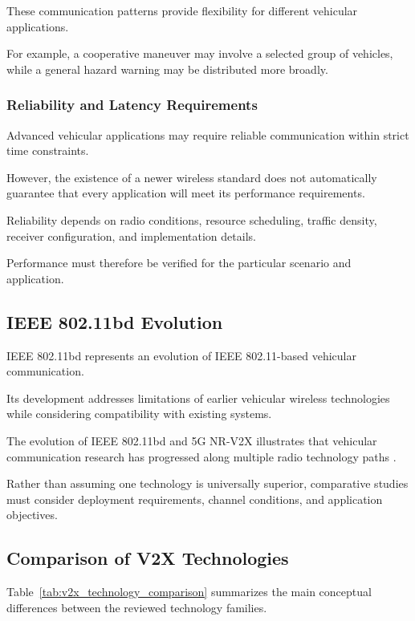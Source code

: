 These communication
patterns provide
flexibility for
different vehicular
applications.

For example, a
cooperative maneuver
may involve a selected
group of vehicles,
while a general
hazard warning
may be distributed
more broadly.

\subsubsection{Reliability and Latency Requirements}

Advanced vehicular
applications may require
reliable communication
within strict
time constraints.

However, the existence
of a newer wireless
standard does not
automatically guarantee
that every application
will meet its
performance requirements.

Reliability depends
on radio conditions,
resource scheduling,
traffic density,
receiver configuration,
and implementation
details.

Performance must
therefore be verified
for the particular
scenario and application.

\subsection{IEEE 802.11bd Evolution}

IEEE 802.11bd represents
an evolution of
IEEE 802.11-based
vehicular communication.

Its development addresses
limitations of earlier
vehicular wireless
technologies while
considering compatibility
with existing systems.

The evolution of
IEEE 802.11bd and
5G NR-V2X illustrates
that vehicular
communication research
has progressed along
multiple radio
technology paths
\cite{Naik2019}.

Rather than assuming
one technology is
universally superior,
comparative studies
must consider
deployment requirements,
channel conditions,
and application objectives.

\subsection{Comparison of V2X Technologies}

Table~\ref{tab:v2x_technology_comparison}
summarizes the main
conceptual differences
between the reviewed
technology families.


